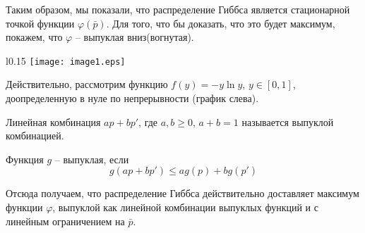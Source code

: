 Таким образом, мы показали, что распределение Гиббса является
стационарной точкой функции $φ(\bar p)$. Для того, что бы доказать,
что это будет максимум, покажем, что $φ$ -- выпуклая вниз(вогнутая).

\begin{wrapfigure}{l}{0.15\textwidth}
    \texttt{[image: image1.eps]}
\end{wrapfigure}
Действительно, рассмотрим функцию $f(y) =-y\ln y$, $y∈[0,1]$,
доопределенную в нуле по непрерывности (график слева).

\begin{df}
  Линейная комбинация $ap+bp'$, где $a,b≥0$, $a+b = 1$ называется
  выпуклой комбинацией.
\end{df}

\begin{df}
  Функция $g$ -- выпуклая, если
  \begin{equation*}
    g(ap+bp') ≤ag(p)+bg(p')
  \end{equation*}
\end{df}

Отсюда получаем, что распределение Гиббса действительно доставляет
максимум функции $φ$, выпуклой как линейной комбинации выпуклых
функций и с линейным ограничением на $\bar p$.
